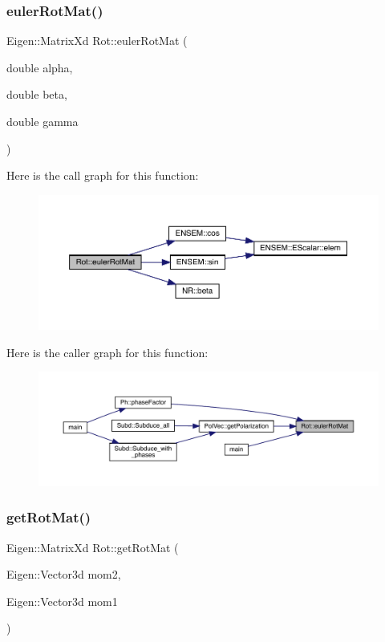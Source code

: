 \subsubsection{\texorpdfstring{eulerRotMat()}{eulerRotMat()}}
{\footnotesize\ttfamily Eigen\+::\+Matrix\+Xd Rot\+::euler\+Rot\+Mat (\begin{DoxyParamCaption}\item[{double}]{alpha,  }\item[{double}]{beta,  }\item[{double}]{gamma }\end{DoxyParamCaption})}

Here is the call graph for this function\+:\nopagebreak
\begin{figure}[H]
\begin{center}
\leavevmode
\includegraphics[width=350pt]{d7/dcc/namespaceRot_adcd0cec8d1616e5f74d30cb3ad1aca99_cgraph}
\end{center}
\end{figure}
Here is the caller graph for this function\+:
\nopagebreak
\begin{figure}[H]
\begin{center}
\leavevmode
\includegraphics[width=350pt]{d7/dcc/namespaceRot_adcd0cec8d1616e5f74d30cb3ad1aca99_icgraph}
\end{center}
\end{figure}
\mbox{\label{namespaceRot_a4026d82f0e6d2b013f7b082ff3d509aa}} 
\subsubsection{\texorpdfstring{getRotMat()}{getRotMat()}}
{\footnotesize\ttfamily Eigen\+::\+Matrix\+Xd Rot\+::get\+Rot\+Mat (\begin{DoxyParamCaption}\item[{Eigen\+::\+Vector3d}]{mom2,  }\item[{Eigen\+::\+Vector3d}]{mom1 }\end{DoxyParamCaption})}

